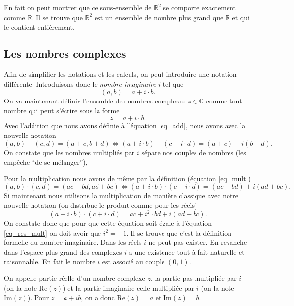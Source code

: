 \documentclass[a4paper,12pt]{book}
\newcommand{\real}{\mathbb{R}}
\newcommand{\complex}{\mathbb{C}}
\renewcommand{\Re}{\mathrm{Re}}
\renewcommand{\Im}{\mathrm{Im}}
\renewcommand{\eqref}[1]{\ref{#1}}
\begin{document}
En fait on peut montrer que ce sous-ensemble de $\real^2$ se comporte exactement comme $\real$. Il se trouve que $\real^2$ est
un ensemble de nombre plus grand que $\real$ et qui le contient entièrement.

\subsection{Les nombres complexes}

Afin de simplifier les notations et les calculs, on peut introduire une notation différente.
Introduisons donc le \textit{nombre imaginaire} $i$ tel que
\begin{equation}
 (a,b)=a+i\cdot b.
\end{equation}
On va maintenant définir l'ensemble des nombres complexes $z\in\complex$ comme tout nombre qui peut s'écrire sous 
la forme 
\begin{equation}
 z=a+i\cdot b.
\end{equation}
Avec l'addition que nous avons définie 
à l'équation \eqref{eq_add}, nous avons avec la nouvelle notation
\begin{equation}
 (a,b)+(c,d)=(a+c,b+d)\Leftrightarrow(a+i\cdot b)+(c+i\cdot d)=(a+c)+i(b+d).
\end{equation}
On constate que les nombres multipliés par $i$ sépare nos couples de nombres (les empêche ``de se mélanger''),

Pour la multiplication nous avons de même par la définition (équation \eqref{eq_mult})
\begin{equation}
 (a,b)\cdot(c,d)=(ac-bd,ad+bc)\Leftrightarrow(a+i\cdot b)\cdot(c+i\cdot d)=(ac-bd)+i(ad+bc).\label{eq_res_mult}
\end{equation}
Si maintenant nous utilisons la multiplication de manière classique avec notre nouvelle notation (on distribue le produit 
comme pour les réels)
\begin{equation}
 (a+i\cdot b)\cdot(c+i\cdot d)=ac+i^2\cdot bd+i(ad+bc).
\end{equation}
On constate donc que pour que cette équation soit égale à l'équation \eqref{eq_res_mult}
on doit avoir que $i^2=-1$. Il se trouve que c'est la définition formelle du nombre imaginaire.
Dans les réels $i$ ne peut pas exister. En revanche dans l'espace plus grand des complexes $i$
a une existence tout à fait naturelle et raisonnable. En fait le nombre $i$ est associé au couple $(0,1)$.

On appelle partie réelle d'un nombre complexe $z$, la partie pas multipliée par $i$ (on la note $\Re(z)$) et la partie imaginaire
celle multipliée par $i$ (on la note $\Im(z)$). Pour $z=a+ib$, on a donc $\Re(z)=a$ et $\Im(z)=b$.
\end{document}
